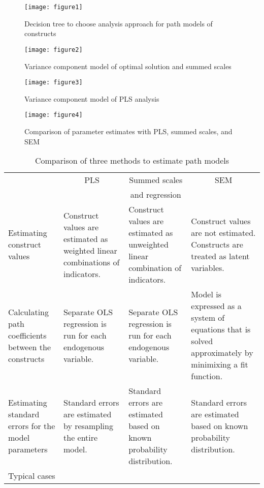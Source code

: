 \documentclass[a4paper,10pt]{article}
\begin{document}
%
%

\begin{figure}[h!]
\centering
\texttt{[image: figure1]}
\caption{Decision tree to choose analysis approach for path models of constructs}
\end{figure}

\begin{figure}[h!]
\centering
\texttt{[image: figure2]}
\caption{Variance component model of optimal solution and summed scales}
\end{figure}

\begin{figure}[h!]
\centering
\texttt{[image: figure3]}
\caption{Variance component model of PLS analysis}
\end{figure}

\begin{figure}[h!]
\centering
\texttt{[image: figure4]}
\caption{Comparison of parameter estimates with PLS, summed scales, and  SEM}
\end{figure}

%
%


\begin{table}[ht]
\begin{center}
\caption{Comparison of three methods to estimate path models}
\begin{tabular}{p{}p{}p{}p{}}
\toprule
&\multicolumn{1}{c}{PLS}&\multicolumn{1}{c}{Summed scales}&\multicolumn{1}{c}{SEM}\\
&&\multicolumn{1}{c}{and regression}\\
\midrule
Estimating construct values&Construct values are estimated as weighted linear combinations of indicators.&Construct values are estimated as unweighted linear combination of indicators.&Construct values are not estimated. Constructs are treated as latent variables. \\ \noalign{\smallskip}
Calculating path coefficients between the constructs&Separate OLS regression is run for each endogenous variable.&Separate OLS regression is run for each endogenous variable.& Model is expressed as a system of equations that is solved approximately by minimixing a fit function. \\ \noalign{\smallskip}
Estimating standard errors for the model parameters&Standard errors are estimated by resampling the entire model.&Standard errors are estimated based on known probability distribution.&Standard errors are estimated based on known probability distribution. \\ 
\bottomrule
\footnotesize{Typical cases}\\
\end{tabular}
\end{center}
\end{table}
\end{document}
